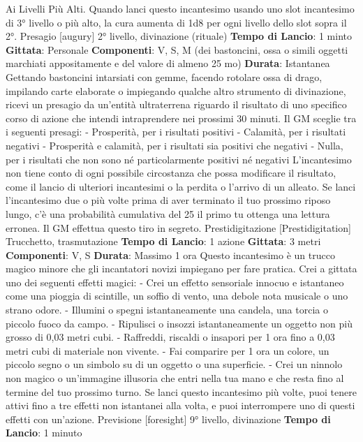 \begin{multicols}{2}
Ai Livelli Più Alti. Quando lanci questo incantesimo
usando uno slot incantesimo di 3° livello o più alto, la
cura aumenta di 1d8 per ogni livello dello slot sopra il
2°.
Presagio
[augury]
2° livello, divinazione (rituale)
\textbf{Tempo di Lancio}: 1 minto
\textbf{Gittata}: Personale
\textbf{Componenti}: V, S, M (dei bastoncini, ossa o simili
oggetti marchiati appositamente e del valore di almeno
25 mo)
\textbf{Durata}: Istantanea
Gettando bastoncini intarsiati con gemme, facendo
rotolare ossa di drago, impilando carte elaborate o
impiegando qualche altro strumento di divinazione,
ricevi un presagio da un’entità ultraterrena riguardo il
risultato di uno specifico corso di azione che intendi
intraprendere nei prossimi 30 minuti. Il GM sceglie tra i
seguenti presagi:
- Prosperità, per i risultati positivi
- Calamità, per i risultati negativi
- Prosperità e calamità, per i risultati sia positivi che
negativi
- Nulla, per i risultati che non sono né particolarmente
positivi né negativi
L’incantesimo non tiene conto di ogni possibile
circostanza che possa modificare il risultato, come il
lancio di ulteriori incantesimi o la perdita o l’arrivo di un
alleato.
Se lanci l’incantesimo due o più volte prima di aver
terminato il tuo prossimo riposo lungo, c’è una
probabilità cumulativa del 25%
il primo tu ottenga una lettura erronea. Il GM effettua
questo tiro in segreto.
Prestidigitazione
[Prestidigitation]
Trucchetto, trasmutazione
\textbf{Tempo di Lancio}: 1 azione
\textbf{Gittata}: 3 metri
\textbf{Componenti}: V, S
\textbf{Durata}: Massimo 1 ora
Questo incantesimo è un trucco magico minore che gli
incantatori novizi impiegano per fare pratica. Crei a
gittata uno dei seguenti effetti magici:
- Crei un effetto sensoriale innocuo e istantaneo
come una pioggia di scintille, un soffio di vento, una
debole nota musicale o uno strano odore.
- Illumini o spegni istantaneamente una candela, una
torcia o piccolo fuoco da campo.
- Ripulisci o insozzi istantaneamente un oggetto non
più grosso di 0,03 metri cubi.
- Raffreddi, riscaldi o insapori per 1 ora fino a 0,03
metri cubi di materiale non vivente.
- Fai comparire per 1 ora un colore, un piccolo segno
o un simbolo su di un oggetto o una superficie.
- Crei un ninnolo non magico o un’immagine illusoria
che entri nella tua mano e che resta fino al termine
del tuo prossimo turno.
Se lanci questo incantesimo più volte, puoi tenere attivi
fino a tre effetti non istantanei alla volta, e puoi
interrompere uno di questi effetti con un’azione.
Previsione
[foresight]
9° livello, divinazione
\textbf{Tempo di Lancio}: 1 minuto

\end{multicols}
